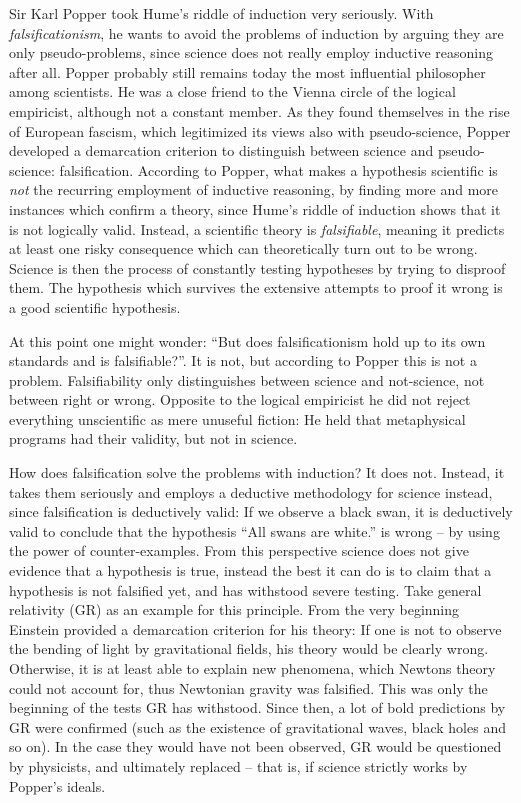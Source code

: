 Sir Karl Popper took Hume's riddle of induction very seriously.
With \emph{falsificationism}, he wants to avoid the
problems of induction by arguing they are only pseudo-problems,
since science does not really employ inductive reasoning after all.
Popper probably still remains today the most influential philosopher
among scientists.
He was a close friend to the Vienna circle of the logical empiricist,
although not a constant member.
As they found themselves in the rise of European fascism, which
legitimized its views also with pseudo-science,
Popper developed a demarcation criterion to distinguish
between science and pseudo-science: falsification.
According to Popper, what makes a hypothesis scientific is \emph{not}
the recurring employment of inductive reasoning, by
finding more and more instances which confirm a theory,
since Hume's riddle of induction shows that it
is not logically valid.
Instead, a scientific theory is \emph{falsifiable}, meaning
it predicts at least one risky consequence which
can theoretically turn out to be wrong.
Science is then the process of constantly testing
hypotheses by trying to disproof them.
The hypothesis which survives the extensive
attempts to proof it wrong is a good scientific hypothesis.

At this point one might wonder:
\enquote{But does falsificationism hold up to its own standards and is falsifiable?}.
It is not, but according to Popper this is not a problem.
Falsifiability only distinguishes between science and not-science, not
between right or wrong.
Opposite to the logical empiricist he did not reject everything
unscientific as mere unuseful fiction:
He held that metaphysical programs had their validity, but not in science.

How does falsification solve the problems with induction?
It does not.
Instead, it takes them seriously and
employs a deductive methodology for science instead, since
falsification is deductively valid:
If we observe a black swan, it is deductively valid to conclude
that the hypothesis \enquote{All swans are white.} is wrong --
by using the power of counter-examples.
From this perspective science does not
give evidence that a hypothesis is true,
instead the best it can do is to claim that a hypothesis is not
falsified yet, and has withstood severe testing.
Take general relativity (GR) as an example for this principle.
From the very beginning Einstein provided a demarcation criterion for his theory:
If one is not to observe the bending of light by gravitational fields, his theory
would be clearly wrong.
Otherwise, it is at least able to explain new phenomena,
which Newtons theory could not account for, thus Newtonian gravity was falsified.
This was only the beginning of the tests GR
has withstood. Since then, a lot of bold predictions by GR were confirmed
(such as the existence of gravitational waves, black holes and so on).
In the case they would have not been observed, GR would be questioned by physicists, and
ultimately replaced -- that is, if
science strictly works by Popper's ideals.

